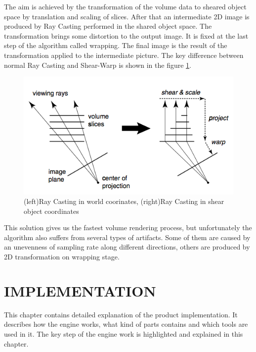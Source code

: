 \documentclass[twoside, english, 11pt]{report}
\begin{document}
The aim is achieved by the transformation of the volume data to sheared object space by translation and scaling of slices. After that an intermediate 2D image is produced by Ray Casting performed in the shared object space. The transformation brings some distortion to the output image. It is fixed at the last step of the algorithm called wrapping. The final image is the result of the transformation applied to the intermediate picture. The key difference between normal Ray Casting and Shear-Warp is shown in the figure \ref{fig:sw}.\\
\begin{figure}[!h]
\centerline{\includegraphics[scale=0.5]{img/shear-warp}}
\caption{(left)Ray Casting in world coorinates, (right)Ray Casting in shear object coordinates\label{fig:sw}}
\end{figure}
This solution gives us the fastest volume rendering process, but unfortunately the algorithm also suffers from several types of artifacts. Some of them are caused by an unevenness of sampling rate along different directions, others are produced by 2D transformation on wrapping stage.

\chapter{IMPLEMENTATION}
This chapter contains detailed explanation of the product implementation. It describes how the engine works, what kind of parts contains and which tools are used in it. The key step of the engine work is highlighted and explained in this chapter.\\
\end{document}
